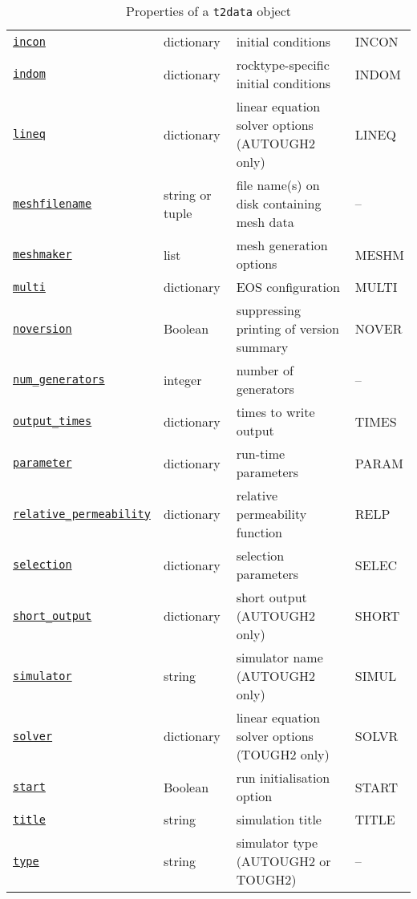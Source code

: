 \begin{sidewaystable}
\begin{center}
\begin{tabular}{|l|l|l|l|}
      \hyperref[sec:t2data:incon]{\texttt{incon}} & dictionary & initial conditions & INCON\\
      \hyperref[sec:t2data:indom]{\texttt{indom}} & dictionary & rocktype-specific initial conditions & INDOM\\
      \hyperref[sec:t2data:lineq]{\texttt{lineq}} & dictionary & linear equation solver options (AUTOUGH2 only) & LINEQ\\
      \hyperref[sec:t2data:meshfilename]{\texttt{meshfilename}} & string or tuple & file name(s) on disk containing mesh data & --\\
      \hyperref[sec:t2data:meshmaker]{\texttt{meshmaker}} & list & mesh generation options & MESHM\\
      \hyperref[sec:t2data:multi]{\texttt{multi}} & dictionary & EOS configuration & MULTI\\
      \hyperref[sec:t2data:noversion]{\texttt{noversion}} & Boolean & suppressing printing of version summary & NOVER\\
      \hyperref[sec:t2data:num_generators]{\texttt{num\_generators}} & integer & number of generators & --\\
      \hyperref[sec:t2data:output_times]{\texttt{output\_times}} & dictionary & times to write output & TIMES\\
      \hyperref[sec:t2data:parameter]{\texttt{parameter}} & dictionary & run-time parameters & PARAM\\
      \hyperref[sec:t2data:relative_permeability]{\texttt{relative\_permeability}} & dictionary & relative permeability function & RELP\\
      \hyperref[sec:t2data:selection]{\texttt{selection}} & dictionary & selection parameters & SELEC\\
      \hyperref[sec:t2data:short_output]{\texttt{short\_output}} & dictionary & short output (AUTOUGH2 only) & SHORT\\
      \hyperref[sec:t2data:simulator]{\texttt{simulator}} & string & simulator name (AUTOUGH2 only) & SIMUL\\
      \hyperref[sec:t2data:solver]{\texttt{solver}} & dictionary & linear equation solver options (TOUGH2 only) & SOLVR\\
      \hyperref[sec:t2data:start]{\texttt{start}} & Boolean & run initialisation option & START\\
      \hyperref[sec:t2data:title]{\texttt{title}} & string & simulation title & TITLE\\
      \hyperref[sec:t2data:type]{\texttt{type}} & string & simulator type (AUTOUGH2 or TOUGH2) & --\\
      \hline
    \end{tabular}
    \caption{Properties of a \texttt{t2data} object}
    \label{tb:t2data_properties}
  \end{center}
\end{sidewaystable}

